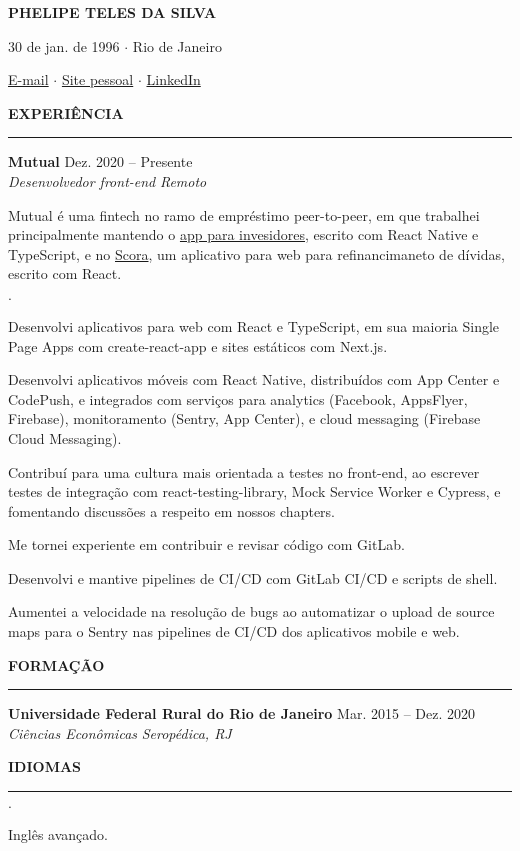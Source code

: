 \documentclass[12pt]{article}
\newenvironment{tightlist}
  {\begin{list}
    {$\cdot$}
    {
      \setlength{\leftmargin}{0em}
      \setlength{\itemsep}{\smallskipamount}
    }
  }
{\end{list}}
\begin{document}
\pagestyle{empty}

\centerline{\huge\bf PHELIPE TELES DA SILVA}
\medskip

\centerline{30 de jan. de 1996 $\cdot$ Rio de Janeiro}
\smallskip

\centerline{
  \href{mailto:telesphelipe@gmail.com}{E-mail}
  $\cdot$
  \href{https://phelipetls.github.io}{Site pessoal}
  $\cdot$
  \href{https://linkedin.com/in/phelipeteles}{LinkedIn}
}
\smallskip

\medskip \textbf{EXPERIÊNCIA} \medskip
\hrule

\textbf{Mutual} \hfill Dez. 2020 -- Presente \\
\textit{Desenvolvedor front-end} \hfill \textit{Remoto} {\parfillskip=0pt\par}

Mutual é uma fintech no ramo de empréstimo peer-to-peer, em que trabalhei
principalmente mantendo o \href{https://mutual.club/en/invest.html}{app para
invesidores}, escrito com React Native e TypeScript, e no
\href{https://scora.com.br/}{Scora}, um aplicativo para web para refinancimaneto
de dívidas, escrito com React.

\medskip

\begin{tightlist}
  \item Desenvolvi aplicativos para web com React e TypeScript, em sua maioria
    Single Page Apps com create-react-app e sites estáticos com Next.js.
  \item Desenvolvi aplicativos móveis com React Native, distribuídos com App
    Center e CodePush, e integrados com serviços para analytics (Facebook,
    AppsFlyer, Firebase), monitoramento (Sentry, App Center), e cloud messaging
    (Firebase Cloud Messaging).
  \item Contribuí para uma cultura mais orientada a testes no front-end, ao
    escrever testes de integração com react-testing-library, Mock Service Worker
    e Cypress, e fomentando discussões a respeito em nossos chapters.
  \item Me tornei experiente em contribuir e revisar código com GitLab.
  \item Desenvolvi e mantive pipelines de CI/CD com GitLab CI/CD e scripts de
    shell.
  \item Aumentei a velocidade na resolução de bugs ao automatizar o upload de
    source maps para o Sentry nas pipelines de CI/CD dos aplicativos mobile e
    web.
\end{tightlist}

\medskip \textbf{FORMAÇÃO} \medskip
\hrule

\textbf{Universidade Federal Rural do Rio de Janeiro} \hfill {Mar. 2015 -- Dez. 2020} \\
\textit{Ciências Econômicas} \hfill \textit{Seropédica, RJ} {\parfillskip=0pt\par}

\medskip \textbf{IDIOMAS} \medskip
\hrule

\begin{tightlist}
  \item Inglês avançado.
\end{tightlist}
\end{document}
